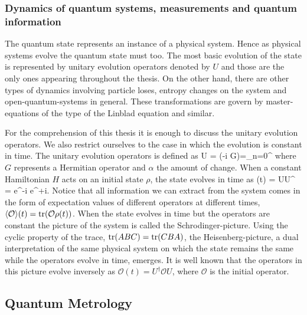 \subsubsection{Dynamics of quantum systems, measurements and quantum information}

The quantum state represents an instance of a physical system.
Hence as physical systems evolve the quantum state must too.
The most basic evolution of the state is represented by unitary evolution operators denoted by $U$ and those are the only ones appearing throughout the thesis.
On the other hand, there are other types of dynamics involving particle loses, entropy changes on the system and open-quantum-systems in general.
These transformations are govern by master-equations of the type of the Linblad equation and similar.

For the comprehension of this thesis it is enough to discuss the unitary evolution operators.
We also restrict ourselves to the case in which the evolution is constant in time.
The unitary evolution operators is defined as
\be
  U = \exp(-i \alpha G)=\sum_{n=0}^{\infty} 
\ee
where $G$ represents a Hermitian operator and $\alpha$ the amount of change.
When a constant Hamiltonian $H$ acts on an initial state $\rho$, the state evolves in time as
\be
  \rho(t) = U\rho U^{\dagger} = e^{-i} \rho e^{+i}.
\ee
Notice that all information we can extract from the system comes in the form of expectation values of different operators at different times, $\langle \mathcal{O} \rangle(t) = \operatorname{tr}(\mathcal{O}\rho(t))$.
When the state evolves in time but the operators are constant the picture of the system is called the Schrodinger-picture.
Using the cyclic property of the trace, $\operatorname{tr}(ABC) = \operatorname{tr}(CBA)$, the Heisenberg-picture, a dual interpretation of the same physical system on which the state remains the same while the operators evolve in time, emerges.
It is well known that the operators in this picture evolve inversely as $\mathcal{O}(t) = U^{\dagger} \mathcal{O} U$, where $\mathcal{O}$ is the initial operator.

\subsection{Quantum Metrology}
\label{sec:bg-quantum-magnetometry}

